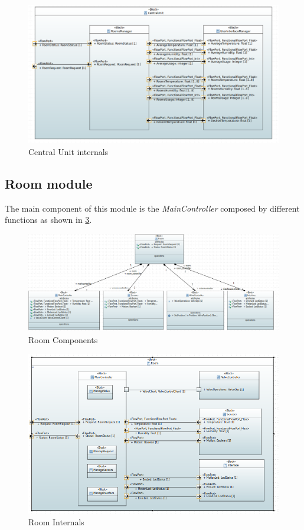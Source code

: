 \begin{figure}[H]
	\centering
	\includegraphics[width=12cm,keepaspectratio]{img/sysml/CentralUnitInternals}
	\caption{Central Unit internals}
	\label{fig:CentralUnit_internals}
\end{figure}


\subsection{Room module}
The main component of this module is the \textit{MainController} composed by different functions as shown in \ref{fig:RoomInternals}.
\begin{figure}[H]
	\centering
	\includegraphics[width=13cm,keepaspectratio]{img/sysml/RoomComponents}
	\caption{Room Components}
	\label{fig:RoomComponents}
\end{figure}

\begin{figure}[H]
	\centering
	\includegraphics[width=13cm,keepaspectratio]{img/sysml/RoomInternals}
	\caption{Room Internals}
	\label{fig:RoomInternals}
\end{figure}

